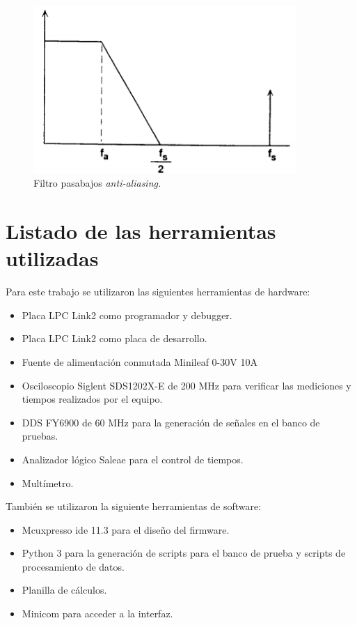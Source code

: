 \begin{figure}[ht]
	\centering
	\includegraphics[width=100mm]{./Figures/muestreo3.png}
	\caption{Filtro pasabajos \it{anti-aliasing}.}
	\label{fig:muestreo3}
\end{figure}

\section{Listado de las herramientas utilizadas}
Para este trabajo se utilizaron las siguientes herramientas de hardware:
\begin{itemize}
\item Placa LPC Link2 como programador y debugger.
\item Placa LPC Link2 como placa de desarrollo.
\item Fuente de alimentación conmutada Minileaf 0-30V 10A
\item Osciloscopio Siglent SDS1202X-E de 200 MHz para verificar las mediciones y tiempos realizados por el equipo.
\item DDS FY6900 de 60 MHz para la generación de señales en el banco de pruebas.
\item Analizador lógico Saleae para el control de tiempos.
\item Multímetro.
\end{itemize}


También se utilizaron la siguiente herramientas de software:
\begin{itemize}
\item Mcuxpresso ide 11.3 para el diseño del firmware.
\item Python 3 para la generación de scripts para el banco de prueba y scripts de procesamiento de datos.
\item Planilla de cálculos.
\item Minicom para acceder a la interfaz.
\end{itemize}
